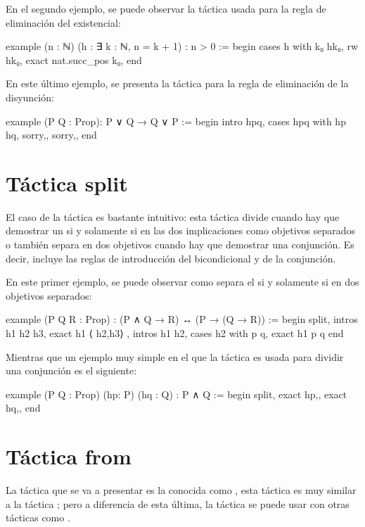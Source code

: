 En el segundo ejemplo, se puede observar la táctica 
usada para la regla de eliminación del existencial:
\begin{leancode}
example (n : ℕ) (h : ∃ k : ℕ, n = k + 1) : n > 0 :=
begin
  cases h with k₀ hk₀,
  rw hk₀,
  exact nat.succ_pos k₀,
end
\end{leancode}

En este último ejemplo, se presenta la táctica  para la
regla de eliminación de la disyunción:

\begin{leancode}
example (P Q : Prop): P ∨ Q → Q ∨ P :=
begin
  intro hpq,
  cases hpq with hp hq,
  {sorry,},
  {sorry,},
end
\end{leancode}

\section{Táctica split}

El caso de la táctica  es bastante intuitivo: esta táctica
divide cuando hay que demostrar un si y solamente si en las dos implicaciones
como objetivos separados o también separa en dos objetivos cuando hay que
demostrar una conjunción. Es decir, incluye las reglas de introducción
del bicondicional y de la conjunción.

En este primer ejemplo, se puede observar como separa el si y solamente si en
dos objetivos separados:

\begin{leancode}
example (P Q R : Prop) : (P ∧ Q → R) ↔ (P → (Q → R)) :=
begin
  split,
  { intros h1 h2 h3,
    exact h1 ⟨ h2,h3⟩ },
  { intros h1 h2,
    cases h2 with p q,
    exact h1 p q}
end
\end{leancode}

Mientras que un ejemplo muy simple en el que la táctica 
es usada para dividir una conjunción es el siguiente:
\begin{leancode}
example (P Q : Prop) (hp: P) (hq : Q) : P ∧ Q :=
begin
  split,
  { exact hp,},
  { exact hq,},
end
\end{leancode}

\section{Táctica from}

La táctica que se va a presentar es la conocida como , esta
táctica es muy similar a la táctica ; pero a diferencia
de esta última, la táctica  se puede usar con otras tácticas
como .

